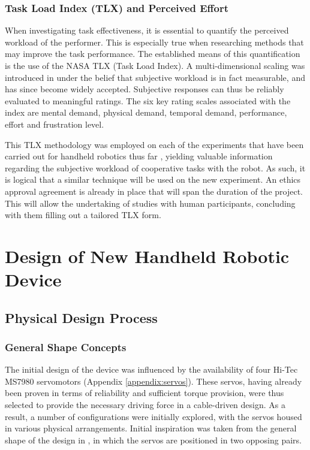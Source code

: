 \documentclass[11pt]{article}
\begin{document}
\subsubsection{Task Load Index (TLX) and Perceived Effort}
\label{section:tlx}

When investigating task effectiveness, it is essential to quantify the perceived workload of the performer. This is especially true when researching methods that may improve the task performance. The established means of this quantification is the use of the NASA TLX (Task Load Index). A multi-dimensional scaling was introduced in \cite{hart1988} under the belief that subjective workload is in fact measurable, and has since become widely accepted. Subjective responses can thus be reliably evaluated to meaningful ratings. The six key rating scales associated with the index are mental demand, physical demand, temporal demand, performance, effort and frustration level. 

This TLX methodology was employed on each of the experiments that have been carried out for handheld robotics thus far \cite{GreggSmithDesign} \cite{GreggSmithFeedback}, yielding valuable information regarding the subjective workload of cooperative tasks with the robot. As such, it is logical that a similar technique will be used on the new experiment. An ethics approval agreement is already in place that will span the duration of the project. This will allow the undertaking of studies with human participants, concluding with them filling out a tailored TLX form. 
\pagebreak


\section{Design of New Handheld Robotic Device}

\subsection{Physical Design Process}
\subsubsection{General Shape Concepts}
The initial design of the device was influenced by the availability of four Hi-Tec MS7980 servomotors (Appendix \ref{appendix:servos}). These servos, having already been proven in terms of reliability and sufficient torque provision, were thus selected to provide the necessary driving force in a cable-driven design. As a result, a number of configurations were initially explored, with the servos housed in various physical arrangements. Initial inspiration was taken from the general shape of the design in \cite{GreggSmithDesign}, in which the servos are positioned in two opposing pairs.
\end{document}
